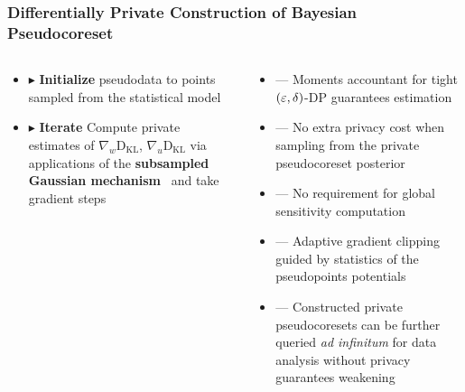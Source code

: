 \documentclass[hyperref={colorlinks = true},unknownkeysallowed]{beamer}
\let\oldcitep=\citep
\renewcommand\citep[1]{\hypersetup{linkcolor=UBCblue}\hyperlink{#1}{\oldcitep{#1}}}
\begin{document}
\begin{frame}
	\frametitle{Differentially Private Construction of Bayesian Pseudocoreset}
	\vspace{-0.7cm}
	\begin{columns}
		\begin{column}[t]{0.4\textwidth}
			\begin{itemize}
				\item $\blacktriangleright$ \textbf{Initialize} pseudodata to points sampled from the statistical model
				\item $\blacktriangleright$ \textbf{Iterate} Compute private estimates of $\nabla_w\mathrm{D}_{\mathrm{KL}}$, $\nabla_u\mathrm{D}_{\mathrm{KL}}$ via applications of the \textbf{subsampled Gaussian mechanism}~\citep{abadi16} and take gradient steps
			\end{itemize}
		\end{column}
		\begin{column}[t]{0.6\textwidth}
			\begin{itemize}
				\item --- Moments accountant for tight $(\varepsilon, \delta)$-DP guarantees estimation
				\item --- No extra privacy cost when sampling from the private pseudocoreset posterior
				\item --- No requirement for global sensitivity computation
				\item --- Adaptive gradient clipping guided by statistics of the pseudopoints potentials
				\item --- Constructed private pseudocoresets can be further queried \emph{ad infinitum} for data analysis without privacy guarantees weakening
			\end{itemize}
		\end{column}
	\end{columns}
\end{frame}
\end{document}
